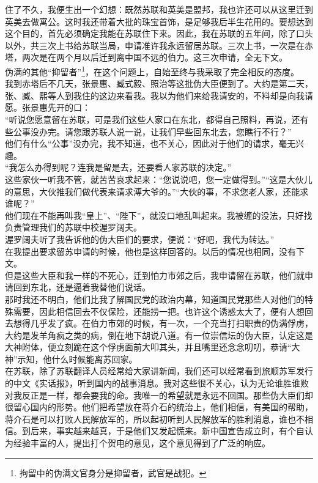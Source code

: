 住了不久，我便生出一个幻想：既然苏联和英美是盟邦，我也许还可以从这里迁到英美去做寓公。这时我还带着大批的珠宝首饰，是足够我后半生花用的。要想达到这个目的，首先必须确定我能在苏联住下来。因此，我在苏联的五年间，除了口头以外，共三次上书给苏联当局，申请准许我永远留居苏联。三次上书，一次是在赤塔，两次是在两个月以后迁到离中国不远的伯力。这三次申请，全无下文。\\

伪满的其他“抑留者”\footnote{拘留中的伪满文官身分是抑留者，武官是战犯。}，在这个问题上，自始至终与我采取了完全相反的态度。\\

我到赤塔后不几天，张景惠、臧式毅、照治等这批伪大臣便到了。大约是第二天，张、臧、熙等人到我住的这边来看我。我以为他们来给我请安的，不料却是向我请愿。张景惠先开的口：\\

“听说您愿意留在苏联，可是我们这些人家口在东北，都得自己照料，再说，还有些公事没办完。请您跟苏联人说一说，让我们早些回东北去，您瞧行不行？”\\

他们有什么“公事”没办完，我不知道，也不关心，因此对于他们的请求，毫无兴趣。\\

“我怎么办得到呢？连我是留是去，还要看人家苏联的决定。”\\

这些家伙一听我不管，就苦苦哀求起来：“您说说吧，您一定做得到。”“这是大伙儿的意思，大伙推我们做代表来请求溥大爷的。”“大伙的事，不求您老人家，还能求谁呢？”\\

他们现在不能再叫我“皇上”、“陛下”，就没口地乱叫起来。我被缠的没法，只好找负责管理我们的苏联中校渥罗阔夫。\\

渥罗阔夫听了我告诉他的伪大臣们的要求，便说：“好吧，我代为转达。”\\

在我提出要求留苏申请的时候，他也是这样回答的。以后的情况也相同，没有下文。\\

但是这些大臣和我一样的不死心，迁到怕力市郊之后，我申请留在苏联，他们就申请回到东北，还是逼着我替他们说话。\\

那时我还不明白，他们比我了解国民党的政治内幕，知道国民党那些人对他们的特殊需要，因此相信回去不仅保险，还能捞一把。也许这个诱惑太大了，便有人想回去想得几乎发了疯。在伯力市郊的时候，有一次，一个充当打扫职责的伪满俘虏，大约是发羊角疯之类的病，倒在地下胡说八道。有一位崇信坛的伪大臣，认定这是大神附体，便立刻跪在这个俘虏面前大叩其头，并且嘴里还念念叨叨，恭请“大神”示知，他什么时候能离苏回家。\\

在苏联，除了苏联翻译人员经常给大家讲新闻，我们还可以经常看到旅顺苏军发行的中文《实话报》，听到国内的战事消息。我对这些很不关心，认为无论谁胜谁败对我反正是一样，都会要我的命。我唯一的希望就是永远不回国。那些伪大臣们却很留心国内的形势。他们把希望放在蒋介石的统治上，他们相信，有美国的帮助，蒋介石是可以打败人民解放军的，所以起初听到人民解放军的胜利消息，谁也不相信。到后来，事实越来越真，于是他们又发起慌来。新中国宣告成立时，有个自认为经验丰富的人，提出打个贺电的意见，这个意见得到了广泛的响应。